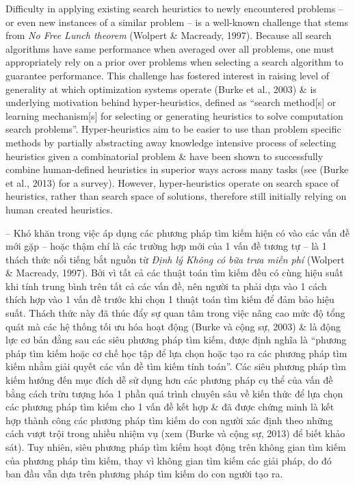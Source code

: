 \documentclass{article}
\begin{document}
\begin{itemize}
    Difficulty in applying existing search heuristics to newly encountered problems -- or even new instances of a similar problem -- is a well-known challenge that stems from {\it No Free Lunch theorem} (Wolpert \& Macready, 1997). Because all search algorithms have same performance when averaged over all problems, one must appropriately rely on a prior over problems when selecting a search algorithm to guarantee performance. This challenge has fostered interest in raising level of generality at which optimization systems operate (Burke et al., 2003) \& is underlying motivation behind hyper-heuristics, defined as ``search method[s] or learning mechanism[s] for selecting or generating heuristics to solve computation search problems''. Hyper-heuristics aim to be easier to use than problem specific methods by partially abstracting away knowledge intensive process of selecting heuristics given a combinatorial problem \& have been shown to successfully combine human-defined heuristics in superior ways across many tasks (see (Burke et al., 2013) for a survey). However, hyper-heuristics operate on search space of heuristics, rather than search space of solutions, therefore still initially relying on human created heuristics.
    
    -- Khó khăn trong việc áp dụng các phương pháp tìm kiếm hiện có vào các vấn đề mới gặp -- hoặc thậm chí là các trường hợp mới của 1 vấn đề tương tự -- là 1 thách thức nổi tiếng bắt nguồn từ {\it Định lý Không có bữa trưa miễn phí} (Wolpert \& Macready, 1997). Bởi vì tất cả các thuật toán tìm kiếm đều có cùng hiệu suất khi tính trung bình trên tất cả các vấn đề, nên người ta phải dựa vào 1 cách thích hợp vào 1 vấn đề trước khi chọn 1 thuật toán tìm kiếm để đảm bảo hiệu suất. Thách thức này đã thúc đẩy sự quan tâm trong việc nâng cao mức độ tổng quát mà các hệ thống tối ưu hóa hoạt động (Burke và cộng sự, 2003) \& là động lực cơ bản đằng sau các siêu phương pháp tìm kiếm, được định nghĩa là ``phương pháp tìm kiếm hoặc cơ chế học tập để lựa chọn hoặc tạo ra các phương pháp tìm kiếm nhằm giải quyết các vấn đề tìm kiếm tính toán''. Các siêu phương pháp tìm kiếm hướng đến mục đích dễ sử dụng hơn các phương pháp cụ thể của vấn đề bằng cách trừu tượng hóa 1 phần quá trình chuyên sâu về kiến thức để lựa chọn các phương pháp tìm kiếm cho 1 vấn đề kết hợp \& đã được chứng minh là kết hợp thành công các phương pháp tìm kiếm do con người xác định theo những cách vượt trội trong nhiều nhiệm vụ (xem (Burke và cộng sự, 2013) để biết khảo sát). Tuy nhiên, siêu phương pháp tìm kiếm hoạt động trên không gian tìm kiếm của phương pháp tìm kiếm, thay vì không gian tìm kiếm các giải pháp, do đó ban đầu vẫn dựa trên phương pháp tìm kiếm do con người tạo ra.
    

\end{itemize}
\end{document}
